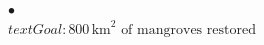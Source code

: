 \documentclass[preview]{standalone}
\begin{document}
\begin{align*}
\bullet\\text{Goal: }800\,\mathrm{km}^2\text{ of mangroves restored}
\end{align*}
\end{document}
